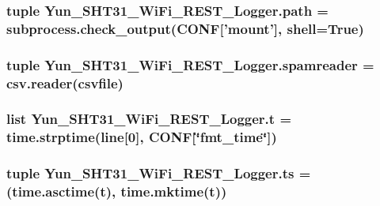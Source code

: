 \hypertarget{namespaceYun__SHT31__WiFi__REST__Logger_a8f92e4f4418b5be2b5415431929989be}{
\subsubsection[{path}]{\setlength{\rightskip}{0pt plus 5cm}tuple Yun\-\_\-\-S\-H\-T31\-\_\-\-Wi\-Fi\-\_\-\-R\-E\-S\-T\-\_\-\-Logger.\-path = subprocess.\-check\-\_\-output({\bf C\-O\-N\-F}\mbox{[}'mount'\mbox{]}, shell=True)}}\label{namespaceYun__SHT31__WiFi__REST__Logger_a8f92e4f4418b5be2b5415431929989be}
\hypertarget{namespaceYun__SHT31__WiFi__REST__Logger_a9c232b263a08fcf2b76be10967951c4b}{
\subsubsection[{spamreader}]{\setlength{\rightskip}{0pt plus 5cm}tuple Yun\-\_\-\-S\-H\-T31\-\_\-\-Wi\-Fi\-\_\-\-R\-E\-S\-T\-\_\-\-Logger.\-spamreader = csv.\-reader(csvfile)}}\label{namespaceYun__SHT31__WiFi__REST__Logger_a9c232b263a08fcf2b76be10967951c4b}
\hypertarget{namespaceYun__SHT31__WiFi__REST__Logger_a8bf98582a5c24eb1e5be5a521b717256}{
\subsubsection[{t}]{\setlength{\rightskip}{0pt plus 5cm}list Yun\-\_\-\-S\-H\-T31\-\_\-\-Wi\-Fi\-\_\-\-R\-E\-S\-T\-\_\-\-Logger.\-t = time.\-strptime(line\mbox{[}0\mbox{]}, {\bf C\-O\-N\-F}\mbox{[}\char`\"{}fmt\-\_\-time\char`\"{}\mbox{]})}}\label{namespaceYun__SHT31__WiFi__REST__Logger_a8bf98582a5c24eb1e5be5a521b717256}
\hypertarget{namespaceYun__SHT31__WiFi__REST__Logger_afcdae84a5401eb4cc3a8b3a31fd07537}{
\subsubsection[{ts}]{\setlength{\rightskip}{0pt plus 5cm}tuple Yun\-\_\-\-S\-H\-T31\-\_\-\-Wi\-Fi\-\_\-\-R\-E\-S\-T\-\_\-\-Logger.\-ts = (time.\-asctime({\bf t}), time.\-mktime({\bf t}))}}\label{namespaceYun__SHT31__WiFi__REST__Logger_afcdae84a5401eb4cc3a8b3a31fd07537}
